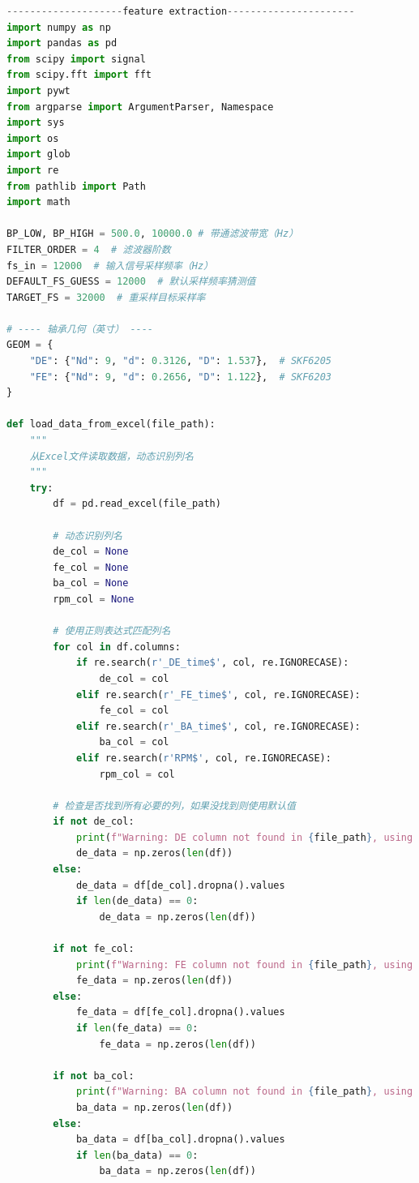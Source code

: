 \documentclass[a4paper]{CPIPC}
\numberwithin{equation}{section}
\begin{document}
\begin{lstlisting}[language=Python, caption=Feature Extraction]
--------------------feature extraction----------------------
import numpy as np
import pandas as pd
from scipy import signal
from scipy.fft import fft
import pywt
from argparse import ArgumentParser, Namespace
import sys
import os
import glob
import re
from pathlib import Path
import math

BP_LOW, BP_HIGH = 500.0, 10000.0 # 带通滤波带宽（Hz）
FILTER_ORDER = 4  # 滤波器阶数
fs_in = 12000  # 输入信号采样频率（Hz）
DEFAULT_FS_GUESS = 12000  # 默认采样频率猜测值
TARGET_FS = 32000  # 重采样目标采样率

# ---- 轴承几何（英寸） ----
GEOM = {
    "DE": {"Nd": 9, "d": 0.3126, "D": 1.537},  # SKF6205
    "FE": {"Nd": 9, "d": 0.2656, "D": 1.122},  # SKF6203
}

def load_data_from_excel(file_path):
    """
    从Excel文件读取数据，动态识别列名
    """
    try:
        df = pd.read_excel(file_path)
        
        # 动态识别列名
        de_col = None
        fe_col = None
        ba_col = None
        rpm_col = None
        
        # 使用正则表达式匹配列名
        for col in df.columns:
            if re.search(r'_DE_time$', col, re.IGNORECASE):
                de_col = col
            elif re.search(r'_FE_time$', col, re.IGNORECASE):
                fe_col = col
            elif re.search(r'_BA_time$', col, re.IGNORECASE):
                ba_col = col
            elif re.search(r'RPM$', col, re.IGNORECASE):
                rpm_col = col
        
        # 检查是否找到所有必要的列，如果没找到则使用默认值
        if not de_col:
            print(f"Warning: DE column not found in {file_path}, using default zeros")
            de_data = np.zeros(len(df))
        else:
            de_data = df[de_col].dropna().values
            if len(de_data) == 0:
                de_data = np.zeros(len(df))
        
        if not fe_col:
            print(f"Warning: FE column not found in {file_path}, using default zeros")
            fe_data = np.zeros(len(df))
        else:
            fe_data = df[fe_col].dropna().values
            if len(fe_data) == 0:
                fe_data = np.zeros(len(df))
        
        if not ba_col:
            print(f"Warning: BA column not found in {file_path}, using default zeros")
            ba_data = np.zeros(len(df))
        else:
            ba_data = df[ba_col].dropna().values
            if len(ba_data) == 0:
                ba_data = np.zeros(len(df))
        

\end{lstlisting}
\end{document}
